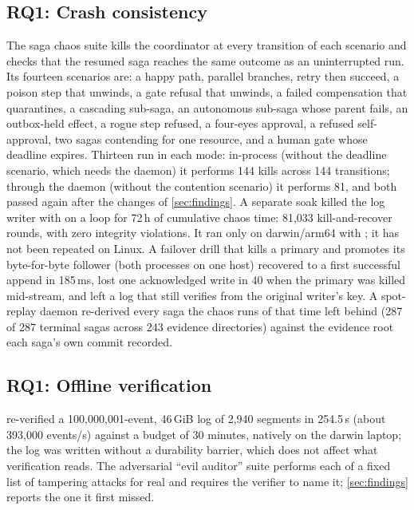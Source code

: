 \subsection{RQ1: Crash consistency}
\label{sec:eval-crash}
The saga chaos suite kills the coordinator at every transition of each scenario
and checks that the resumed saga reaches the same outcome as an uninterrupted
run. Its fourteen scenarios are: a happy path, parallel branches, retry then
succeed, a poison step that unwinds, a gate refusal that unwinds, a failed
compensation that quarantines, a cascading sub-saga, an autonomous sub-saga
whose parent fails, an outbox-held effect, a rogue step refused, a four-eyes
approval, a refused self-approval, two sagas contending for one resource, and a
human gate whose deadline expires. Thirteen run in each mode: in-process
(without the deadline scenario, which needs the daemon) it performs 144 kills
across 144 transitions; through the daemon (without the contention scenario) it
performs 81, and both passed again after the changes of \cref{sec:findings}.
A separate soak killed the log writer with  on a loop for 72\,h
of cumulative chaos time: 81{,}033 kill-and-recover rounds, with zero integrity
violations. It ran only on darwin/arm64 with ; it has not been
repeated on Linux.
A failover drill that kills a primary and promotes its byte-for-byte follower
(both processes on one host) recovered to a first successful append in 185\,ms,
lost one acknowledged write in 40 when the primary was killed mid-stream, and
left a log that still verifies from the original writer's key.
A spot-replay daemon re-derived every saga the chaos runs of that time left
behind (287 of 287 terminal sagas across 243 evidence directories) against the
evidence root each saga's own commit recorded.

\subsection{RQ1: Offline verification}
\label{sec:eval-verify}
 re-verified a 100{,}000{,}001-event, 46\,GiB log of 2{,}940
segments in 254.5\,s (about 393{,}000 events/s) against a budget of 30 minutes,
natively on the darwin laptop; the log was written without a durability barrier,
which does not affect what verification reads.
The adversarial ``evil auditor'' suite performs each of a fixed list of
tampering attacks for real and requires the verifier to name it; \cref{sec:findings}
reports the one it first missed.

